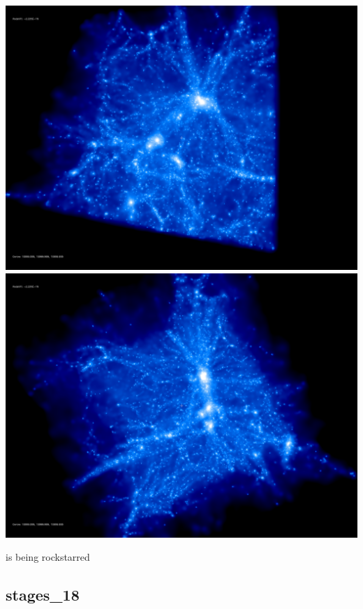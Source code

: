 \includegraphics[scale=0.1]{stages_14/rotate_00074.jpg} 
\includegraphics[scale=0.1]{stages_14/rotate_00131.jpg}

is being rockstarred  \\

% 
%
%
%
%
%
%
%

\newpage
\subsection{stages\_18}


